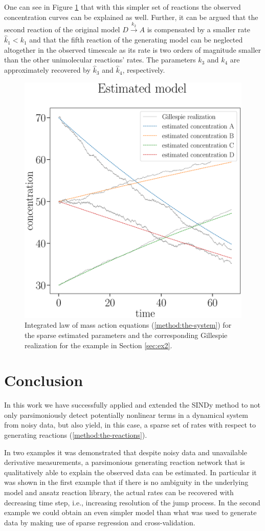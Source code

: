 \documentclass[oneside, abstracton, titlepage]{scrartcl}
\begin{document}
	One can see in Figure \ref{ex2:result} that with this simpler set of reactions the observed concentration curves can be explained as well. Further, it can be argued that the second reaction of the original model $D\xrightarrow{k_2}A$ is compensated by a smaller rate $\hat{k}_1 < k_1$ and that the fifth reaction of the generating model can be neglected altogether in the observed timescale as its rate is two orders of magnitude smaller than the other unimolecular reactions' rates.
	The parameters $k_3$ and $k_4$ are approximately recovered by $\hat{k}_3$ and $\hat{k}_4$, respectively.
	
	\begin{figure}
		\begin{center}
			\includegraphics[width=.5\textwidth]{./figures_tex/cv_expected_estimated_concentrations}
		\end{center}
		\caption{Integrated law of mass action equations (\ref{method:the-system}) for the sparse estimated parameters and the corresponding Gillespie realization for the example in Section \ref{sec:ex2}.}
		\label{ex2:result}
	\end{figure}
	
	\section{Conclusion}
	In this work we have successfully applied and extended the SINDy method to not only parsimoniously detect potentially nonlinear terms in a dynamical system from noisy data, but also yield, in this case, a sparse set of rates with respect to generating reactions (\ref{method:the-reactions}).
	
	In two examples it was demonstrated that despite noisy data and unavailable derivative measurements, a parsimonious generating reaction network that is qualitatively able to explain the observed data can be estimated. 
	In particular it was shown in the first example that if there is no ambiguity in the underlying model and ansatz reaction library, the actual rates can be recovered with decreasing time step, i.e., increasing resolution of the jump process. 
	In the second example we could obtain an even simpler model than what was used to generate data by making use of sparse regression and cross-validation.
	
	\newpage
% 	
	
	
	
\end{document}
